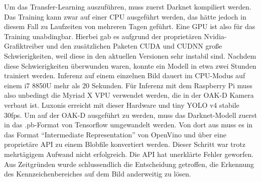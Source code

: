 Um das Transfer-Learning auszuführen, muss zuerst Darknet kompiliert werden. Das Training kann zwar auf einer CPU ausgeführt werden, das hätte jedoch in diesem Fall zu Laufzeiten von mehreren Tagen geführt. Eine GPU ist also für das Training unabdingbar.
Hierbei gab es aufgrund der proprietären Nvidia-Grafiktreiber und den zusätzlichen Paketen CUDA und CUDNN große Schwierigkeiten, weil diese in den aktuellen Versionen sehr instabil sind.%
Nachdem diese Schwierigkeiten überwunden waren, konnte ein Modell in etwa zwei Stunden trainiert werden. Inferenz auf einem einzelnen Bild dauert im CPU-Modus auf einem i7 8850U mehr als 20 Sekunden. Für Inferenz mit dem Raspberry Pi muss also unbedingt die Myriad X VPU verwendet werden, die in der OAK-D Kamera verbaut ist. Luxonis erreicht mit dieser Hardware und tiny YOLO v4 stabile 30fps. \autocite[Vgl.][]{Luxonis1}
Um auf der OAK-D ausgeführt zu werden, muss das Darknet-Modell zuerst in das .pb-Format von Tensorflow umgewandelt werden.
Von dort aus muss es in das Format \enquote{Intermediate Representation} von OpenVino und über eine proprietäre API zu einem Blobfile konvertiert werden.
Dieser Schritt war trotz mehrtägigem Aufwand nicht erfolgreich. Die API hat unerklärte Fehler geworfen. Aus Zeitgründen wurde schlussendlich die Entscheidung getroffen, die Erkennung des Kennzeichenbereiches auf dem Bild anderweitig zu lösen.


